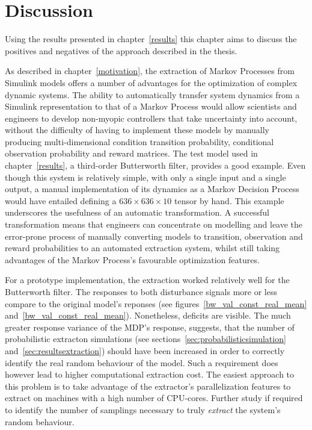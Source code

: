 \chapter{Discussion}
\label{discussion}

Using the results presented in chapter~\ref{results} this chapter aims to discuss the positives and negatives of the approach described in the thesis.

As described in chapter~\ref{motivation}, the extraction of Markov Processes from Simulink models offers a number of advantages for the optimization of complex dynamic systems. The ability to automatically transfer system dynamics from a Simulink representation to that of a Markov Process would allow scientists and engineers to develop non-myopic controllers that take uncertainty into account, without the difficulty of having to implement these models by manually producing multi-dimensional condition transition probability, conditional observation probability and reward matrices. The test model used in chapter~\ref{results}, a third-order Butterworth filter, provides a good example. Even though this system is relatively simple, with only a single input and a single output, a manual implementation of its dynamics as a Markov Decision Process would have entailed defining a $636\times636\times10$ tensor by hand. This example underscores the usefulness of an automatic transformation. A successful transformation means that engineers can concentrate on modelling and leave the error-prone process of manually converting models to transition, observation and reward probabilities to an automated extraction system, whilst still taking advantages of the Markov Process's favourable optimization features.

For a prototype implementation, the extraction worked relatively well for the Butterworth filter. The responses to both disturbance signals more or less compare to the original model's reponses (see figures~\ref{bw_val_const_real_mean} and~\ref{bw_val_const_real_mean}). Nonetheless, deficits are visible. The much greater response variance of the MDP's response, suggests, that the number of probabilistic extracton simulations (see sections~\ref{sec:probabilisticsimulation} and~\ref{sec:resultsextraction}) should have been increased in order to correctly identify the real random behaviour of the model. Such a requirement does however lead to higher computational extraction cost. The easiest approach to this problem is to take advantage of the extractor's parallelization features to extract on machines with a high number of CPU-cores. Further study if required to identify the number of samplings necessary to truly \textit{extract} the system's random behaviour.

